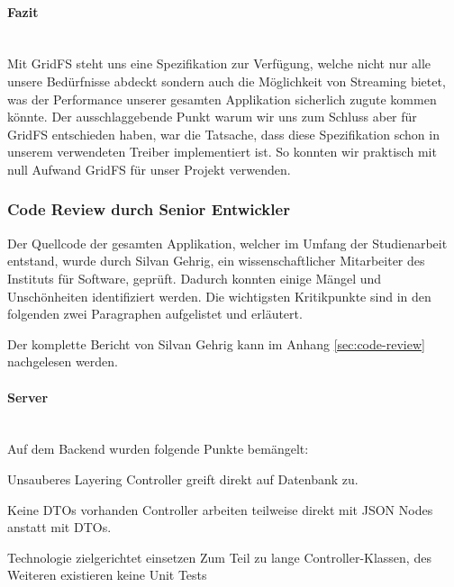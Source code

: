 \paragraph{Fazit}~\\
Mit GridFS steht uns eine Spezifikation zur Verfügung, welche nicht nur alle unsere Bedürfnisse abdeckt sondern auch die Möglichkeit von Streaming bietet, was der Performance unserer gesamten Applikation sicherlich zugute kommen könnte. Der ausschlaggebende Punkt warum wir uns zum Schluss aber für GridFS entschieden haben, war die Tatsache, dass diese Spezifikation schon in unserem verwendeten Treiber implementiert ist. So konnten wir praktisch mit null Aufwand GridFS für unser Projekt verwenden.
\newpage

\subsubsection{Code Review durch Senior Entwickler}
Der Quellcode der gesamten Applikation, welcher im Umfang der Studienarbeit entstand, wurde durch Silvan Gehrig, ein wissenschaftlicher Mitarbeiter des Instituts für Software, geprüft. Dadurch konnten einige Mängel und Unschönheiten identifiziert werden. Die wichtigsten Kritikpunkte sind in den folgenden zwei Paragraphen aufgelistet und erläutert.

Der komplette Bericht von Silvan Gehrig kann im Anhang \ref{sec:code-review} nachgelesen werden.

\paragraph{Server}~\\
Auf dem Backend wurden folgende Punkte bemängelt:
\begin{basedescript}{
		\desclabelstyle{\multilinelabel}
		\desclabelwidth{4.5cm}
		\setlength{\itemsep}{5ex}}
		\item[Unsauberes Layering] Controller greift direkt auf Datenbank zu.
		\item[Keine DTOs vorhanden] Controller arbeiten teilweise direkt mit JSON Nodes anstatt mit DTOs.
		
		\item[Technologie zielgerichtet einsetzen] Zum Teil zu lange Controller-Klassen, des Weiteren existieren keine Unit Tests
		
\end{basedescript}
